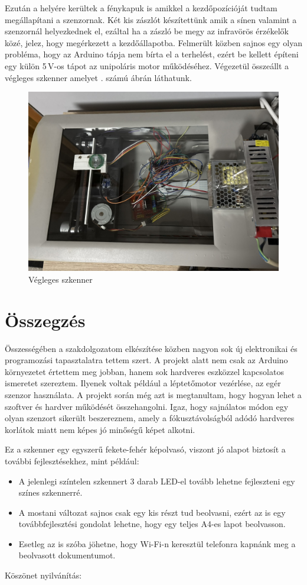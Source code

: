 \documentclass[]{thesis-ekf}
\theoremstyle{definition}
\theoremstyle{remark}
\begin{document}
Ezután a helyére kerültek a fénykapuk is amikkel a kezdőpozícióját tudtam megállapítani a szenzornak. Két kis zászlót készítettünk amik a sínen valamint a szenzornál helyezkednek el, ezáltal ha a zászló be megy az infravörös érzékelők közé, jelez, hogy megérkezett a kezdőállapotba. Felmerült közben sajnos egy olyan probléma, hogy az Arduino tápja nem bírta el a terhelést, ezért be kellett építeni egy külön 5\,V-os tápot az unipoláris motor működéséhez. Végezetül összeállt a végleges szkenner amelyet . számú ábrán láthatunk.
\begin{figure}[th!]
	\centering
	\includegraphics[width=0.7\linewidth]{finished_scanner}
	\caption[Végleges szkenner]{Végleges szkenner}
	\label{fig:finishedscanner}
\end{figure}

\chapter*{Összegzés}
Összességében a szakdolgozatom elkészítése közben nagyon sok új elektronikai és programozási tapasztalatra tettem szert. A projekt alatt nem csak az Arduino környezetet értettem meg jobban, hanem sok hardveres eszközzel kapcsolatos ismeretet szereztem. Ilyenek voltak például a léptetőmotor vezérlése, az egér szenzor használata. A projekt során még azt is megtanultam, hogy hogyan lehet a szoftver és hardver működését összehangolni. Igaz, hogy sajnálatos módon egy olyan szenzort sikerült beszereznem, amely a fókusztávolságból adódó hardveres korlátok miatt nem képes jó minőségű képet alkotni.

Ez a szkenner egy egyszerű fekete-fehér képolvasó, viszont jó alapot biztosít a további fejlesztésekhez, mint például:
\begin{itemize}
	\item A jelenlegi színtelen szkennert 3 darab LED-el tovább lehetne fejleszteni egy színes szkennerré.
	\item A mostani változat sajnos csak egy kis részt tud beolvasni, ezért az is egy továbbfejlesztési gondolat lehetne, hogy egy teljes A4-es lapot beolvasson.
	\item Esetleg az is szóba jöhetne, hogy Wi-Fi-n keresztül telefonra kapnánk meg a beolvasott dokumentumot.
\end{itemize}
\vspace*{2cm}
Köszönet nyilvánítás: 
\end{document}
